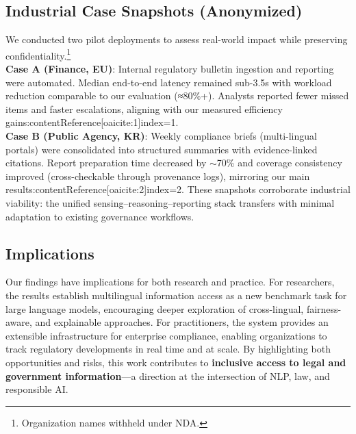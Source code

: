 {\subsection{Industrial Case Snapshots (Anonymized)}
We conducted two pilot deployments to assess real-world impact while preserving confidentiality.\footnote{Organization names withheld under NDA.}
~\\
\textbf{Case A (Finance, EU)}: Internal regulatory bulletin ingestion and reporting were automated. Median end-to-end latency remained sub-3.5s with workload reduction comparable to our evaluation (≈80\%+). Analysts reported fewer missed items and faster escalations, aligning with our measured efficiency gains:contentReference[oaicite:1]{index=1}.
~\\
\textbf{Case B (Public Agency, KR)}: Weekly compliance briefs (multi-lingual portals) were consolidated into structured summaries with evidence-linked citations. Report preparation time decreased by $\sim$70\% and coverage consistency improved (cross-checkable through provenance logs), mirroring our main results:contentReference[oaicite:2]{index=2}.
These snapshots corroborate industrial viability: the unified sensing--reasoning--reporting stack transfers with minimal adaptation to existing governance workflows.


\subsection{Implications}
Our findings have implications for both research and practice. 
For researchers, the results establish multilingual information access as a new benchmark task for large language models, encouraging deeper exploration of cross-lingual, fairness-aware, and explainable approaches. 
For practitioners, the system provides an extensible infrastructure for enterprise compliance, enabling organizations to track regulatory developments in real time and at scale. 
By highlighting both opportunities and risks, this work contributes to \textbf{inclusive access to legal and government information}—a direction at the intersection of NLP, law, and responsible AI. 


}
